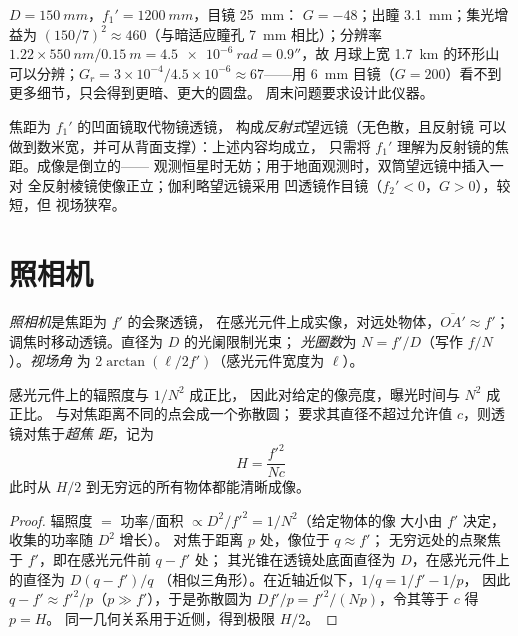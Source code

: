 \begin{example}\label{ex:b1:optical-instruments:telnum}
$D = \qty{150}{mm}$，$f_1' = \qty{1200}{mm}$，目镜 \qty{25}{mm}：
$G = -48$；出瞳 \qty{3.1}{mm}；集光增益为 $(150/7)^2 \approx
460$（与暗适应瞳孔 \qty{7}{mm} 相比）；分辨率 $1.22 \times
\qty{550}{nm}/\qty{0.15}{m} = \qty{4.5e-6}{rad} = 0.9''$，故
月球上宽 \qty{1.7}{km} 的环形山可以分辨；$G_r = 3\times10^{-4}/4.5\times
10^{-6} \approx 67$——用 \qty{6}{mm} 目镜（$G = 200$）看不到
更多细节，只会得到更暗、更大的圆盘。
周末问题要求设计此仪器。
\end{example}

\begin{remark}\label{rem:b1:optical-instruments:variants}
焦距为 $f_1'$ 的凹面镜取代物镜透镜，
构成\emph{反射式}望远镜（无色散，且反射镜
可以做到数米宽，并可从背面支撑）：上述内容均成立，
只需将 $f_1'$ 理解为反射镜的焦距。成像是倒立的——
观测恒星时无妨；用于地面观测时，双筒望远镜中插入一对
全反射棱镜使像正立；伽利略望远镜采用
凹透镜作目镜（$f_2' < 0$，$G > 0$），较短，但
视场狭窄。
\end{remark}

\section{照相机}

\begin{definition}\label{def:b1:optical-instruments:camera}
\emph{照相机}是焦距为 $f'$ 的会聚透镜，
在感光元件上成实像，对远处物体，$\overline{OA'} \approx f'$；
调焦时移动透镜。直径为 $D$ 的光阑限制光束；
\emph{光圈数}为 $N = f'/D$（写作 $f/N$）。\emph{视场角}
为 $2\arctan(\ell/2f')$（感光元件宽度为 $\ell$）。
\end{definition}

\begin{proposition}[曝光与景深]\label{prop:b1:optical-instruments:dof}
感光元件上的辐照度与 $1/N^2$ 成正比，
因此对给定的像亮度，曝光时间与 $N^2$ 成正比。
与对焦距离不同的点会成一个弥散圆；
要求其直径不超过允许值 $c$，则透镜对焦于\emph{超焦
距}，记为
\[
H = \frac{f'^2}{N c}
\]
此时从 $H/2$ 到无穷远的所有物体都能清晰成像。
\end{proposition}

\begin{proof}
辐照度 $=$ 功率/面积 $\propto D^2/f'^2 = 1/N^2$（给定物体的像
大小由 $f'$ 决定，收集的功率随 $D^2$ 增长）。
对焦于距离 $p$ 处，像位于 $q \approx f'$；
无穷远处的点聚焦于 $f'$，即在感光元件前 $q - f'$ 处；
其光锥在透镜处底面直径为 $D$，在感光元件上的直径为 $D(q - f')/q$
（相似三角形）。在近轴近似下，$1/q = 1/f' - 1/p$，
因此 $q - f' \approx f'^2/p$（$p \gg f'$），于是弥散圆为
$Df'/p = f'^2/(Np)$，令其等于 $c$ 得 $p = H$。
同一几何关系用于近侧，得到极限 $H/2$。
\end{proof}

